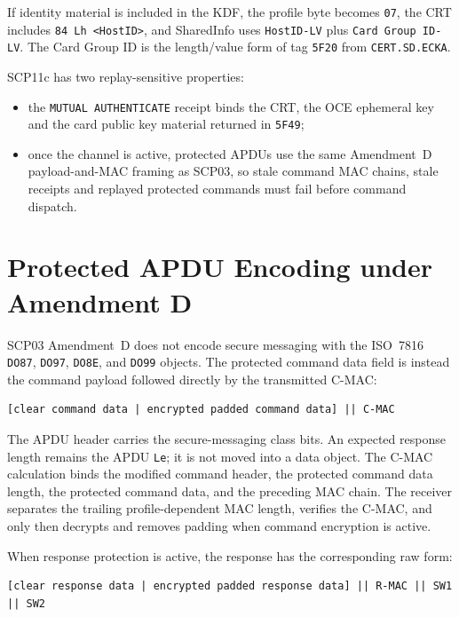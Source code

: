 If identity material is included in the KDF, the profile byte becomes
\texttt{07}, the CRT includes \texttt{84 Lh <HostID>}, and SharedInfo uses
\texttt{HostID-LV} plus \texttt{Card Group ID-LV}. The Card Group ID is the
length/value form of tag \texttt{5F20} from \texttt{CERT.SD.ECKA}.

SCP11c has two replay-sensitive properties:
\begin{itemize}
\item the \texttt{MUTUAL AUTHENTICATE} receipt binds the CRT, the OCE
      ephemeral key and the card public key material returned in \texttt{5F49};
\item once the channel is active, protected APDUs use the same Amendment~D
      payload-and-MAC framing as SCP03, so stale command MAC chains, stale receipts and replayed
      protected commands must fail before command dispatch.
\end{itemize}

\section{Protected APDU Encoding under Amendment D}

SCP03 Amendment~D does not encode secure messaging with the ISO~7816
\texttt{DO87}, \texttt{DO97}, \texttt{DO8E}, and \texttt{DO99} objects.  The
protected command data field is instead the command payload followed directly
by the transmitted C-MAC:

\begin{verbatim}
[clear command data | encrypted padded command data] || C-MAC
\end{verbatim}

The APDU header carries the secure-messaging class bits.  An expected response
length remains the APDU \texttt{Le}; it is not moved into a data object.  The
C-MAC calculation binds the modified command header, the protected command
data length, the protected command data, and the preceding MAC chain.  The
receiver separates the trailing profile-dependent MAC length, verifies the
C-MAC, and only then decrypts and removes padding when command encryption is
active.

When response protection is active, the response has the corresponding raw
form:

\begin{verbatim}
[clear response data | encrypted padded response data] || R-MAC || SW1 || SW2
\end{verbatim}

